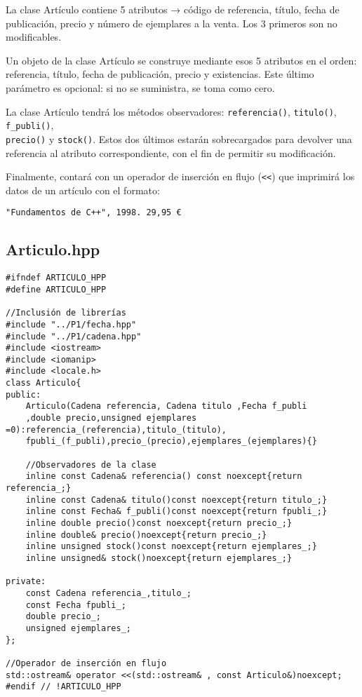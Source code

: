 La clase Artículo contiene 5 atributos → código de referencia, título, fecha de publicación, 
precio y número de ejemplares a la venta. Los 3 primeros son no modificables.

Un objeto de la clase Artículo se construye mediante esos 5 atributos en el orden: 
referencia, título, fecha de publicación, precio y existencias.
Este último parámetro es opcional: si no se suministra, se toma como cero.

La clase Artículo tendrá los métodos observadores: \texttt{referencia()}, \texttt{titulo()},
 \texttt{f\_publi()},\\ \texttt{precio()} y \texttt{stock()}. 
 Estos dos últimos estarán sobrecargados para devolver una referencia al atributo correspondiente, con el fin de permitir su modificación.

Finalmente, contará con un operador de inserción en flujo (\texttt{<<}) que imprimirá los 
datos de un artículo con el formato:

\begin{center}
\texttt{"Fundamentos de C++", 1998. 29,95 €}
\end{center}

\subsection{Articulo.hpp}
\begin{verbatim}
#ifndef ARTICULO_HPP
#define ARTICULO_HPP

//Inclusión de librerías
#include "../P1/fecha.hpp"
#include "../P1/cadena.hpp"
#include <iostream>
#include <iomanip>
#include <locale.h>
class Articulo{
public:
    Articulo(Cadena referencia, Cadena titulo ,Fecha f_publi
    ,double precio,unsigned ejemplares =0):referencia_(referencia),titulo_(titulo),
    fpubli_(f_publi),precio_(precio),ejemplares_(ejemplares){}

    //Observadores de la clase
    inline const Cadena& referencia() const noexcept{return referencia_;}
    inline const Cadena& titulo()const noexcept{return titulo_;}
    inline const Fecha& f_publi()const noexcept{return fpubli_;}
    inline double precio()const noexcept{return precio_;}
    inline double& precio()noexcept{return precio_;}
    inline unsigned stock()const noexcept{return ejemplares_;}
    inline unsigned& stock()noexcept{return ejemplares_;}

private:
    const Cadena referencia_,titulo_;
    const Fecha fpubli_;
    double precio_;
    unsigned ejemplares_;
};

//Operador de inserción en flujo
std::ostream& operator <<(std::ostream& , const Articulo&)noexcept;
#endif // !ARTICULO_HPP 
\end{verbatim}
\newpage
